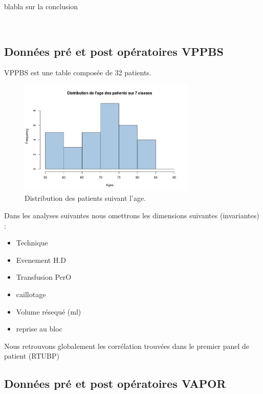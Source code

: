 blabla sur la conclusion

\newpage
~
\newpage




\subsection{Données pré et post opératoires VPPBS }


VPPBS est une table composée de 32 patients. 
\begin{figure}[!h]
\centering
\includegraphics[width=0.75\textwidth]{../Fig/VPPBS/vppbs-age-frequency.png}
\caption{Distribution des patients suivant l'age.}
\end{figure}



Dans les analyses suivantes nous omettrons les dimensions suivantes  (invariantes)  :  

\begin{itemize}
\item Technique
\item Evenement H.D
\item Transfusion PerO
\item caillotage
\item Volume résequé (ml) 
\item reprise au bloc 
\end{itemize}

Nous retrouvons globalement les corrélation trouvées dans le premier panel de patient (RTUBP) 


\subsection{Données pré et post opératoires VAPOR}
\newpage